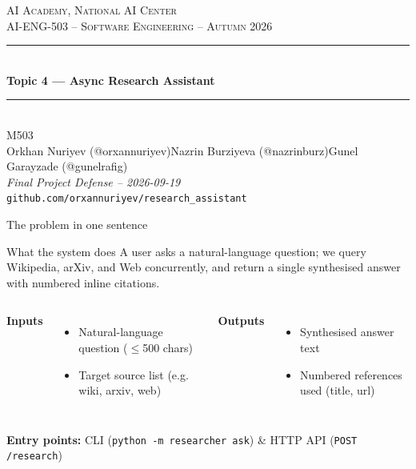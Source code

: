 \documentclass[aspectratio=169,11pt]{beamer}
\makeatletter
\newcommand{\teamname}{M503}
\newcommand{\topicchoice}{Topic 4 --- Async Research Assistant}
\newcommand{\memberone}{Orkhan Nuriyev (@orxannuriyev)}
\newcommand{\membertwo}{Nazrin Burziyeva (@nazrinburz)}
\newcommand{\memberthree}{Gunel Garayzade (@gunelrafig)}
\newcommand{\repolink}{github.com/orxannuriyev/research\_assistant}
\newcommand{\coursecode}{AI-ENG-503}
\newcommand{\coursename}{Software Engineering}
\newcommand{\institution}{AI Academy, National AI Center}
\newcommand{\semester}{Autumn 2026}
\makeatother
\begin{document}
{%
\begin{frame}[plain]
  \begin{center}
    \vspace{0.6cm}
    {\small \textsc{\institution}}\\[0.2em]
    {\small \textsc{\coursecode{} -- \coursename{} -- \semester{}}}\\[1.2em]
    \rule{0.7\textwidth}{0.6pt}\\[0.4em]
    {\Huge\bfseries\color{accent} \topicchoice}\\[0.4em]
    \rule{0.7\textwidth}{0.6pt}\\[1.2em]
    {\large \teamname}\\[0.6em]
    {\normalsize \memberone\quad\textbullet\quad\membertwo\quad\textbullet\quad\memberthree}\\[1cm]
    {\footnotesize\itshape Final Project Defense -- 2026-09-19}\\[0.4em]
    {\footnotesize\texttt{\repolink}}
  \end{center}
\end{frame}
}

\begin{frame}{The problem in one sentence}
  \begin{block}{What the system does}
    A user asks a natural-language question; we query Wikipedia, arXiv, and Web concurrently, and return a single synthesised answer with numbered inline citations.
  \end{block}

  \vspace{0.3em}
  \begin{columns}[T,onlytextwidth]
  \textbf{Inputs}
  \begin{itemize}
    \item Natural-language question ($\le$500 chars)
    \item Target source list (e.g. wiki, arxiv, web)
  \end{itemize}

  \textbf{Outputs}
  \begin{itemize}
    \item Synthesised answer text
    \item Numbered references used (title, url)
  \end{itemize}
  \end{columns}

  \vspace{0.4em}
  \textbf{Entry points:} CLI (\texttt{python -m researcher ask}) \& HTTP API (\texttt{POST /research})
\end{frame}
\end{document}
